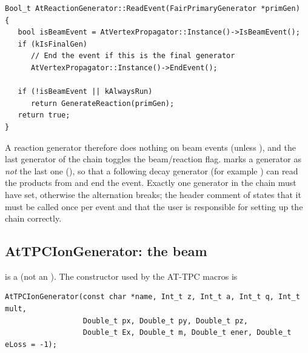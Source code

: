 \begin{verbatim}
Bool_t AtReactionGenerator::ReadEvent(FairPrimaryGenerator *primGen)
{
   bool isBeamEvent = AtVertexPropagator::Instance()->IsBeamEvent();
   if (kIsFinalGen)
      // End the event if this is the final generator
      AtVertexPropagator::Instance()->EndEvent();

   if (!isBeamEvent || kAlwaysRun)
      return GenerateReaction(primGen);
   return true;
}
\end{verbatim}

A reaction generator therefore does nothing on beam events (unless ), and
the last generator of the chain toggles the beam/reaction flag. 
marks a generator as \emph{not} the last one (), so that a following
decay generator (for example ) can read the products from
 and end the event. Exactly one generator in the chain must have
 set, otherwise the alternation breaks; the header comment of
 states that it must be called once per event and that the user
is responsible for setting up the chain correctly.

\subsection{AtTPCIonGenerator: the beam}

 is a  (not an ). The
constructor used by the AT-TPC macros is

\begin{verbatim}
AtTPCIonGenerator(const char *name, Int_t z, Int_t a, Int_t q, Int_t mult,
                  Double_t px, Double_t py, Double_t pz,
                  Double_t Ex, Double_t m, Double_t ener, Double_t eLoss = -1);
\end{verbatim}

